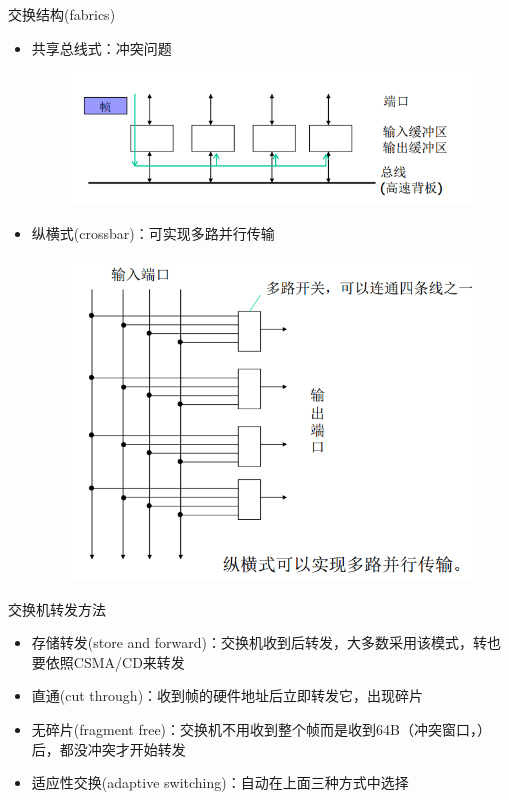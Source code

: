 \myhline
交换结构(fabrics)
\begin{itemize}
	\item 共享总线式：冲突问题
	\begin{figure}[H]
		\centering
		\includegraphics[width=0.6\linewidth]{fig/switch-share.png}
	\end{figure}
	\item 纵横式(crossbar)：可实现多路并行传输
	\begin{figure}[H]
		\centering
		\includegraphics[width=0.5\linewidth]{fig/switch-crossbar.png}
	\end{figure}
\end{itemize}

\myhline
交换机转发方法
\begin{itemize}
\item 存储转发(store and forward)：交换机收到后转发，大多数采用该模式，转也要依照CSMA/CD来转发
\item 直通(cut through)：收到帧的硬件地址后立即转发它，出现碎片
\item 无碎片(fragment free)：交换机不用收到整个帧而是收到64B（冲突窗口，）后，都没冲突才开始转发
\item 适应性交换(adaptive switching)：自动在上面三种方式中选择
\end{itemize}


